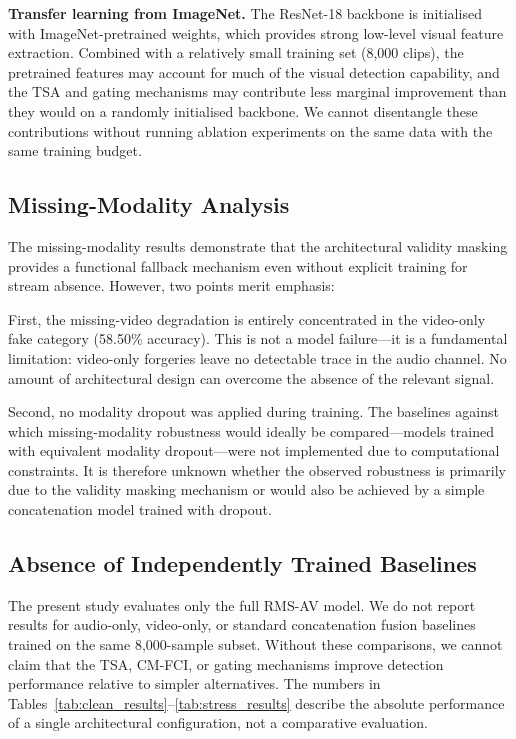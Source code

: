 \documentclass[conference]{IEEEtran}
\begin{document}
\textbf{Transfer learning from ImageNet.} The ResNet-18 backbone is initialised with ImageNet-pretrained weights, which provides strong low-level visual feature extraction. Combined with a relatively small training set (8{,}000 clips), the pretrained features may account for much of the visual detection capability, and the TSA and gating mechanisms may contribute less marginal improvement than they would on a randomly initialised backbone. We cannot disentangle these contributions without running ablation experiments on the same data with the same training budget.

\subsection{Missing-Modality Analysis}

The missing-modality results demonstrate that the architectural validity masking provides a functional fallback mechanism even without explicit training for stream absence. However, two points merit emphasis:

First, the missing-video degradation is entirely concentrated in the video-only fake category (58.50\% accuracy). This is not a model failure---it is a fundamental limitation: video-only forgeries leave no detectable trace in the audio channel. No amount of architectural design can overcome the absence of the relevant signal.

Second, no modality dropout was applied during training. The baselines against which missing-modality robustness would ideally be compared---models trained with equivalent modality dropout---were not implemented due to computational constraints. It is therefore unknown whether the observed robustness is primarily due to the validity masking mechanism or would also be achieved by a simple concatenation model trained with dropout.

\subsection{Absence of Independently Trained Baselines}

The present study evaluates only the full RMS-AV model. We do not report results for audio-only, video-only, or standard concatenation fusion baselines trained on the same 8{,}000-sample subset. Without these comparisons, we cannot claim that the TSA, CM-FCI, or gating mechanisms improve detection performance relative to simpler alternatives. The numbers in Tables~\ref{tab:clean_results}--\ref{tab:stress_results} describe the absolute performance of a single architectural configuration, not a comparative evaluation.
\end{document}
